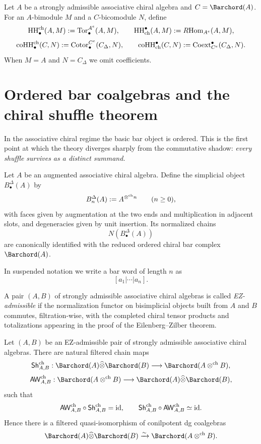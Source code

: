 \begin{definition}
Let $A$ be a strongly admissible associative chiral algebra and $C=\Barchord(A)$.
For an $A$-bimodule $M$ and a $C$-bicomodule $N$, define
\[
\operatorname{HH}^{\mathrm{ch}}_\bullet(A,M):=\operatorname{Tor}_\bullet^{A^e}(A,M),
\qquad
\operatorname{HH}_{\mathrm{ch}}^\bullet(A,M):=R\!\operatorname{Hom}_{A^e}(A,M),
\]
\[
\operatorname{coHH}^{\mathrm{ch}}_\bullet(C,N):=\operatorname{Cotor}_\bullet^{C^e}(C_\Delta,N),
\qquad
\operatorname{coHH}_{\mathrm{ch}}^\bullet(C,N):=\operatorname{Coext}_{C^e}^\bullet(C_\Delta,N).
\]
When $M=A$ and $N=C_\Delta$ we omit coefficients.
\end{definition}

\section{Ordered bar coalgebras and the chiral shuffle theorem}
\label{sec:shuffle}

In the associative chiral regime the basic bar object is ordered. This is the first point at which
the theory diverges sharply from the commutative shadow: \emph{every shuffle survives as a distinct
summand.}

\begin{definition}
Let $A$ be an augmented associative chiral algebra. Define the simplicial object
$B^\Delta_\bullet(A)$ by
\[
B^\Delta_n(A):=A^{\mathbin{\otimes^{\mathrm{ch}}} n}\qquad (n\geq 0),
\]
with faces given by augmentation at the two ends and multiplication in adjacent slots, and
degeneracies given by unit insertion. Its normalized chains
\[
N(B^\Delta_\bullet(A))
\]
are canonically identified with the reduced ordered chiral bar complex $\Barchord(A)$.
\end{definition}

In suspended notation we write a bar word of length $n$ as
\[
[a_1|\cdots|a_n].
\]

\begin{definition}
A pair $(A,B)$ of strongly admissible associative chiral algebras is called \emph{EZ-admissible} if
the normalization functor on bisimplicial objects built from $A$ and $B$ commutes, filtration-wise,
with the completed chiral tensor products and totalizations appearing in the proof of the
Eilenberg--Zilber theorem.
\end{definition}

\begin{theorem}
\ClaimStatusProvedHere
\label{thm:shuffle}
Let $(A,B)$ be an EZ-admissible pair of strongly admissible associative chiral algebras.
There are natural filtered chain maps
\[
\mathsf{Sh}^{\mathrm{ch}}_{A,B}:
\Barchord(A)\widehat\otimes \Barchord(B)\longrightarrow \Barchord(A\chotimes B),
\]
\[
\mathsf{AW}^{\mathrm{ch}}_{A,B}:
\Barchord(A\chotimes B)\longrightarrow \Barchord(A)\widehat\otimes \Barchord(B),
\]
such that
\[
\mathsf{AW}^{\mathrm{ch}}_{A,B}\circ \mathsf{Sh}^{\mathrm{ch}}_{A,B}=\mathrm{id},
\qquad
\mathsf{Sh}^{\mathrm{ch}}_{A,B}\circ \mathsf{AW}^{\mathrm{ch}}_{A,B}\simeq \mathrm{id}.
\]
Hence there is a filtered quasi-isomorphism of conilpotent dg coalgebras
\[
\Barchord(A)\widehat\otimes \Barchord(B)\xrightarrow{\sim}\Barchord(A\chotimes B).
\]
\end{theorem}

